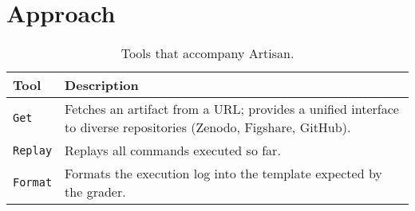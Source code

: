\section{Approach}
\label{s:approach}

\begin{table}[t]
\caption{Tools that accompany Artisan.}
\label{t:artisan_tools}
\centering
\renewcommand{\arraystretch}{1.25}
\begin{tabularx}{\linewidth}{lX}
\toprule
\textbf{Tool} & \textbf{Description} \\
\midrule
\texttt{Get} & Fetches an artifact from a URL; provides a unified interface to diverse repositories (Zenodo, Figshare, GitHub). \\
\texttt{Replay} & Replays all commands executed so far. \\
\texttt{Format} & Formats the execution log into the template expected by the grader. \\
\bottomrule
\end{tabularx}
\end{table}

